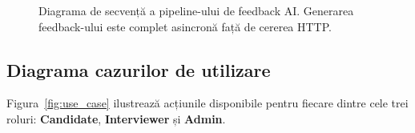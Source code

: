 \begin{figure}[ht]
\caption{Diagrama de secvență a pipeline-ului de feedback AI.
  Generarea feedback-ului este complet asincronă față de cererea HTTP.}
\label{fig:seq_ai}
\end{figure}


\subsection{Diagrama cazurilor de utilizare}
\label{subsec:diagrama_use_case}

Figura~\ref{fig:use_case} ilustrează acțiunile disponibile pentru fiecare
dintre cele trei roluri: \textbf{Candidate}, \textbf{Interviewer} și
\textbf{Admin}.

